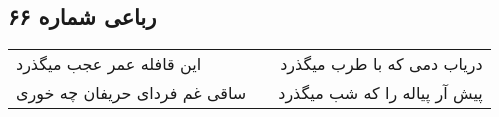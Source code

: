 \begin{center}
\section*{رباعی شماره ۶۶}
\label{sec:sh066}
\begin{longtable}{l p{0.5cm} r}
این قافله عمر عجب میگذرد
&&
دریاب دمی که با طرب میگذرد
\\
ساقی غم فردای حریفان چه خوری
&&
پیش آر پیاله را که شب میگذرد
\\
\end{longtable}
\end{center}

